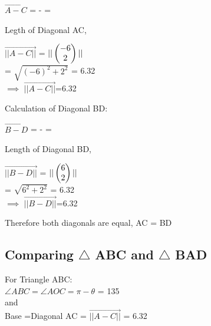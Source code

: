 \documentclass[journal,10pt,twocolumn]{article}
\begin{document}
\begin{flushleft}
\vspace{0.1cm}

$\vec{A-C}$ =  -  = 
	\\
\begin{flushleft}
Legth of Diagonal AC,\\
\end{flushleft}


$\vec{||A-C||}$ = $ || \begin{pmatrix}-6 \\ 2\end{pmatrix} ||$
	\\
\vspace{0.25cm}
= $\sqrt{(-6)^2+2^2}$ = 6.32\\
\vspace{0.3cm}
$\implies$ $\vec{||A-C||}$=6.32\\

\vspace{0.3cm}
\begin{flushleft}
Calculation of Diagonal BD:\\
\end{flushleft}

\vspace{0.25cm}

$\vec{B-D}$ = -  = 
	\\
\begin{flushleft}
Length of Diagonal BD,\\
\end{flushleft}

$\vec{||B-D||}$ =  $||\begin{pmatrix}6 \\2\end{pmatrix}||$
	\\
\vspace{0.25cm}
= $\sqrt{6^2+2^2}$ = 6.32\\
\vspace{0.25cm}
$\implies$ $\vec{||B-D||}$=6.32\\
\begin{flushleft}
Therefore both diagonals are equal,  AC = BD \\
\end{flushleft}

\subsection{Comparing $\triangle$ ABC and $\triangle$ BAD }
\begin{flushleft}
\vspace{0.25cm}
For Triangle ABC:\\
\vspace{0.25cm}
$\angle ABC = \angle AOC = \pi -\theta$ = 135 \textdegree \\
\vspace{0.25cm}
and\\
\vspace{0.25cm}
Base =Diagonal AC  = $\vec{||A-C||}$ = 6.32\\
\vspace{0.35cm}


\end{flushleft}
\end{flushleft}
\end{document}
